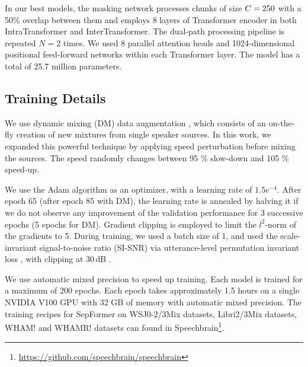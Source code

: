 \documentclass[lettersize,journal]{IEEEtran}
\begin{document}
In our best models, the masking network processes chunks of size $C=250$ with a 50\% overlap between them and employs 8 layers of Transformer encoder in both IntraTransformer and InterTransformer. The dual-path processing pipeline is repeated $N=2$ times. We used 8 parallel attention heads and 1024-dimensional positional feed-forward networks within each Transformer layer. The model has a total of 25.7 million parameters. 

\subsection{Training Details}
\newcommand{\dataaug}{DM}
We use dynamic mixing (DM) data augmentation \cite{zeghidour2020wavesplit}, which consists of an on-the-fly creation of new mixtures from single speaker sources. In this work, we expanded this powerful technique by applying speed perturbation before mixing the sources. The speed randomly changes between 95 \% slow-down and 105 \% speed-up.





We use the Adam algorithm \cite{kingma2017adam} as an optimizer, with a learning rate of $1.5e^{-4}$. After epoch 65 (after epoch 85 with \dataaug), the learning rate is annealed by halving it if we do not observe any improvement of the validation performance for 3 successive epochs (5 epochs for \dataaug). Gradient clipping is employed to limit the $l^2$-norm of the gradients to 5. During training, we used a batch size of 1, and used the scale-invariant signal-to-noise ratio (SI-SNR) \cite{le2019sdr} via utterance-level permutation invariant loss \cite{kolbaek2017multitalker}, with clipping at 30\,dB \cite{zeghidour2020wavesplit}. 

We use automatic mixed precision to speed up training. Each model is trained for a maximum of 200 epochs. Each epoch takes approximately 1.5 hours on a single NVIDIA V100 GPU with 32 GB of memory with automatic mixed precision. The training recipes for SepFormer on WSJ0-2/3Mix datasets, Libri2/3Mix datasets, WHAM! and WHAMR! datasets can found in Speechbrain\footnote{\url{https://github.com/speechbrain/speechbrain}}. 
\end{document}
